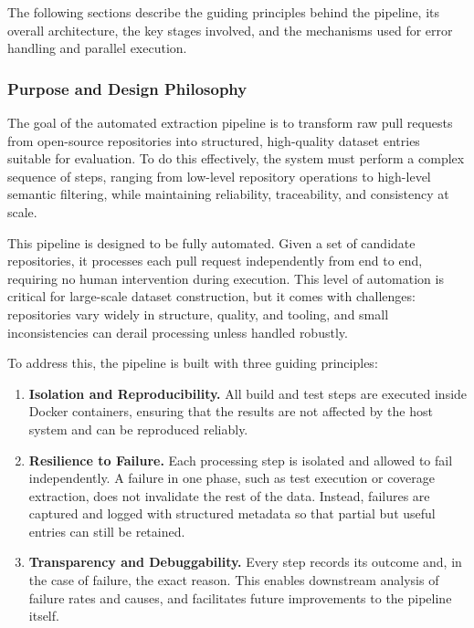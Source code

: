 The following sections describe the guiding principles behind the pipeline, its overall
architecture, the key stages involved, and the mechanisms used for error handling and parallel
execution.

\subsubsection{Purpose and Design Philosophy}

The goal of the automated extraction pipeline is to transform raw pull requests from open-source
repositories into structured, high-quality dataset entries suitable for evaluation. To do this
effectively, the system must perform a complex sequence of steps, ranging from low-level repository
operations to high-level semantic filtering, while maintaining reliability, traceability, and
consistency at scale.

This pipeline is designed to be fully automated. Given a set of candidate repositories, it processes
each pull request independently from end to end, requiring no human intervention during execution.
This level of automation is critical for large-scale dataset construction, but it comes with
challenges: repositories vary widely in structure, quality, and tooling, and small inconsistencies
can derail processing unless handled robustly.

To address this, the pipeline is built with three guiding principles:
\begin{enumerate}
	\item \textbf{Isolation and Reproducibility.} All build and test steps are executed inside
	      Docker containers, ensuring that the results are not affected by the host system and can
	      be reproduced reliably.

	\item \textbf{Resilience to Failure.} Each processing step is isolated and allowed to fail
	      independently. A failure in one phase, such as test execution or coverage extraction, does
	      not invalidate the rest of the data. Instead, failures are captured and logged with
	      structured metadata so that partial but useful entries can still be retained.

	\item \textbf{Transparency and Debuggability.} Every step records its outcome and, in the case
	      of failure, the exact reason. This enables downstream analysis of failure rates and causes,
	      and facilitates future improvements to the pipeline itself.
\end{enumerate}

